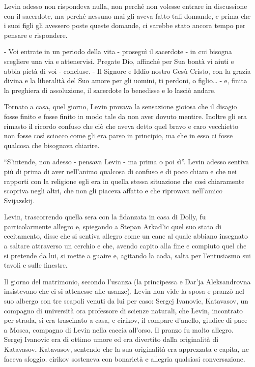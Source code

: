 Levin adesso non rispondeva nulla, non perché non volesse entrare in discussione con il sacerdote, ma perché nessuno mai gli aveva fatto tali domande, e prima che i suoi figli gli avessero poste queste domande, ci sarebbe stato ancora tempo per pensare e rispondere. 

- Voi entrate in un periodo della vita - proseguì il sacerdote - in cui bisogna scegliere una via e attenervisi. Pregate Dio, affinché per Sua bontà vi aiuti e abbia pietà di voi - concluse. - Il Signore e Iddio nostro Gesù Cristo, con la grazia divina e la liberalità del Suo amore per gli uomini, ti perdoni, o figlio\ldots{} - e, finita la preghiera di assoluzione, il sacerdote lo benedisse e lo lasciò andare. 

Tornato a casa, quel giorno, Levin provava la sensazione gioiosa che il disagio fosse finito e fosse finito in modo tale da non aver dovuto mentire. Inoltre gli era rimasto il ricordo confuso che ciò che aveva detto quel bravo e caro vecchietto non fosse così sciocco come gli era parso in principio, ma che in esso ci fosse qualcosa che bisognava chiarire. 
\enlargethispage*{1\baselineskip}

``S'intende, non adesso - pensava Levin - ma prima o poi sì''. Levin adesso sentiva più di prima di aver nell'animo qualcosa di confuso e di poco chiaro e che nei rapporti con la religione egli era in quella stessa situazione che così chiaramente scopriva negli altri, che non gli piaceva affatto e che riprovava nell'amico Svijazskij. 

Levin, trascorrendo quella sera con la fidanzata in casa di Dolly, fu particolarmente allegro e, spiegando a Stepan Arkad'ic quel suo stato di eccitamento, disse che si sentiva allegro come un cane al quale abbiano insegnato a saltare attraverso un cerchio e che, avendo capito alla fine e compiuto quel che si pretende da lui, si mette a guaire e, agitando la coda, salta per l'entusiasmo sui tavoli e sulle finestre. 

Il giorno del matrimonio, secondo l'usanza (la principessa e Dar'ja Aleksandrovna insistevano che ci si attenesse alle usanze), Levin non vide la sposa e pranzò nel suo albergo con tre scapoli venuti da lui per caso: Sergej Ivanovic, Katavasov, un compagno di università ora professore di scienze naturali, che Levin, incontrato per strada, si era trascinato a casa, e cirikov, il compare d'anello, giudice di pace a Mosca, compagno di Levin nella caccia all'orso. Il pranzo fu molto allegro. Sergej Ivanovic era di ottimo umore ed era divertito dalla originalità di Katavasov. Katavasov, sentendo che la sua originalità era apprezzata e capita, ne faceva sfoggio. cirikov sosteneva con bonarietà e allegria qualsiasi conversazione. 

